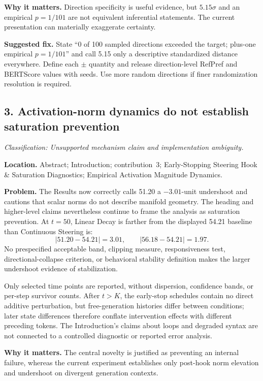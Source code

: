 \documentclass[11pt]{article}
\newcommand{\findinglabel}[1]{\textbf{#1}}
\newcommand{\classification}[1]{\textit{Classification: #1.}}
\begin{document}
\findinglabel{Why it matters.} Direction specificity is useful evidence, but $5.15\sigma$ and an empirical $p=1/101$ are not equivalent inferential statements.  The current presentation can materially exaggerate certainty.

\findinglabel{Suggested fix.} State ``0 of 100 sampled directions exceeded the target; plus-one empirical $p=1/101$'' and call 5.15 only a descriptive standardized distance everywhere.  Define each $\pm$ quantity and release direction-level RefPref and BERTScore values with seeds.  Use more random directions if finer randomization resolution is required.

\subsection*{3. Activation-norm dynamics do not establish saturation prevention}

\classification{Unsupported mechanism claim and implementation ambiguity}

\findinglabel{Location.} Abstract; Introduction; contribution~3; Early-Stopping Steering Hook \& Saturation Diagnostics; Empirical Activation Magnitude Dynamics.

\findinglabel{Problem.} The Results now correctly calls 51.20 a $-3.01$-unit undershoot and cautions that scalar norms do not describe manifold geometry.  The heading and higher-level claims nevertheless continue to frame the analysis as saturation prevention.  At $t=50$, Linear Decay is farther from the displayed 54.21 baseline than Continuous Steering is:
\[
|51.20-54.21|=3.01,
\qquad
|56.18-54.21|=1.97.
\]
No prespecified acceptable band, clipping measure, responsiveness test, directional-collapse criterion, or behavioral stability definition makes the larger undershoot evidence of stabilization.

Only selected time points are reported, without dispersion, confidence bands, or per-step survivor counts.  After $t>K$, the early-stop schedules contain no direct additive perturbation, but free-generation histories differ between conditions; later state differences therefore conflate intervention effects with different preceding tokens.  The Introduction's claims about loops and degraded syntax are not connected to a controlled diagnostic or reported error analysis.

\findinglabel{Why it matters.} The central novelty is justified as preventing an internal failure, whereas the current experiment establishes only post-hook norm elevation and undershoot on divergent generation contexts.
\end{document}
